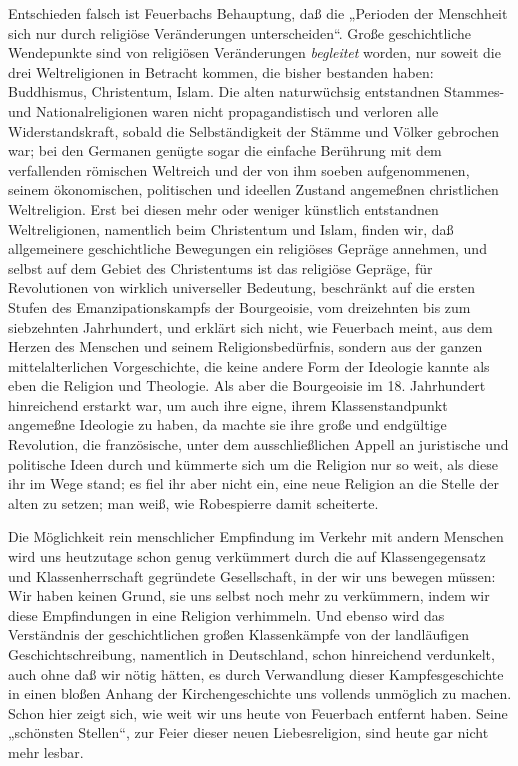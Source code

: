 Entschieden falsch ist Feuerbachs Behauptung, daß die „Perioden
der Menschheit sich nur durch religiöse Veränderungen unterscheiden``. \textbar{}
Große geschichtliche Wendepunkte sind von religiösen
Veränderungen \emph{begleitet} worden, nur soweit die drei
Weltreligionen in Betracht kommen, die bisher bestanden haben:
Buddhismus, Christentum, Islam.\textbar{} Die alten naturwüchsig entstandnen
Stammes- und Nationalreligionen waren \textbar{} nicht propagandistisch und
verloren \textbar{} alle Widerstandskraft, sobald die Selbständigkeit der Stämme
und Völker gebrochen war; bei den Germanen genügte sogar die einfache
Berührung mit dem verfallenden römischen Weltreich und der von ihm
soeben aufgenommenen, seinem ökonomischen, politischen und ideellen
Zustand angemeßnen christlichen Weltreligion. Erst bei diesen mehr oder
weniger künstlich entstandnen Weltreligionen, namentlich beim
Christentum und Islam, finden wir, daß allgemeinere geschichtliche
Bewegungen ein religiöses Gepräge annehmen, und \textbar{} selbst auf dem Gebiet
des Christentums \textbar{} ist das religiöse Gepräge, für Revolutionen von
wirklich universeller Bedeutung, beschränkt auf die ersten Stufen des
Emanzipationskampfs der Bourgeoisie, vom dreizehnten bis zum siebzehnten
Jahrhundert, und erklärt sich nicht, wie Feuerbach meint, aus dem Herzen
des Menschen und seinem Religionsbedürfnis, sondern aus der ganzen
mittelalterlichen Vorgeschichte, die keine andere Form der Ideologie
kannte als eben die Religion und Theologie. Als aber die Bourgeoisie im
18. Jahrhundert hinreichend erstarkt war, um auch ihre eigne, ihrem
Klassenstandpunkt angemeßne Ideologie zu haben, da machte sie ihre große
und endgültige Revolution, die französische, unter dem ausschließlichen
Appell an juristische und politische Ideen durch und kümmerte sich um
die Religion nur so weit, als diese ihr im Wege stand; es fiel ihr aber
nicht ein, eine neue Religion an die Stelle der alten zu setzen; \textbar{} man
weiß, wie Robespierre damit scheiterte.\textbar{}

Die Möglichkeit rein menschlicher Empfindung im Verkehr mit
andern Menschen wird uns heutzutage schon genug verkümmert durch die auf
Klassengegensatz und Klassenherrschaft gegründete Gesellschaft, in der
wir uns bewegen müssen: Wir haben keinen Grund, sie uns selbst noch mehr
zu verkümmern, indem wir diese Empfindungen in eine Religion verhimmeln.
Und ebenso wird das Verständnis der geschichtlichen großen Klassenkämpfe
von der landläufigen Geschichtschreibung, namentlich in Deutschland,
schon hinreichend verdunkelt, auch ohne daß wir nötig hätten, es durch
Verwandlung dieser Kampfesgeschichte in einen bloßen Anhang der
Kirchengeschichte uns vollends unmöglich zu machen. Schon hier zeigt
sich, wie weit wir uns heute von Feuerbach entfernt haben. Seine
„schönsten Stellen``, zur Feier dieser neuen Liebesreligion, sind heute
gar nicht mehr lesbar.

